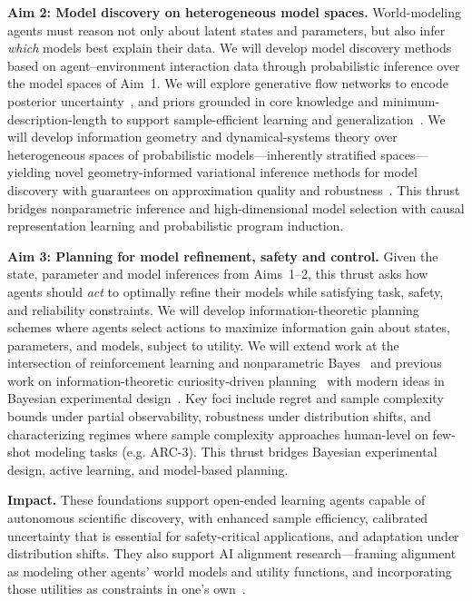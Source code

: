 \documentclass[11pt,letterpaper]{article}
\begin{document}
\textbf{Aim 2: Model discovery on heterogeneous model spaces.}
World-modeling agents must reason not only about latent states and parameters, but also infer \emph{which} models best explain their data. We will develop model discovery methods based on agent--environment interaction data through probabilistic inference over the model spaces of Aim~1. We will explore generative flow networks to encode posterior uncertainty~\cite{bengio_gflownet_2023}, and priors grounded in core knowledge and minimum-description-length to support sample-efficient learning and generalization~\cite{da_costa_overfitting_nodate,pouncyInductiveBiasesTheorybased2022}. We will develop information geometry and dynamical-systems theory over heterogeneous spaces of probabilistic models---inherently stratified spaces---yielding novel geometry-informed variational inference methods for model discovery with guarantees on approximation quality and robustness~\cite{dacostaPossiblePrinciplesAligned2025}. This thrust bridges nonparametric inference and high-dimensional model selection with causal representation learning and probabilistic program induction.


\textbf{Aim 3: Planning for model refinement, safety and control.}
Given the state, parameter and model inferences from Aims~1--2, this thrust asks how agents should \emph{act} to optimally refine their models while satisfying task, safety, and reliability constraints. We will develop information-theoretic planning schemes where agents select actions to maximize information gain about states, parameters, and models, subject to utility. We will extend work at the intersection of reinforcement learning and nonparametric Bayes~\cite{doshi} and previous work on information-theoretic curiosity-driven planning~\cite{friston_sophisticated_2021,champion_branching_2021,paul_efficient_2023} with modern ideas in Bayesian experimental design~\cite{rainforthModernBayesianExperimental2023}. Key foci include regret and sample complexity bounds under partial observability, robustness under distribution shifts, and characterizing regimes where sample complexity approaches human-level on few-shot modeling tasks (e.g. ARC-3). This thrust bridges Bayesian experimental design, active learning, and model-based planning.

\textbf{Impact.} These foundations support open-ended learning agents capable of autonomous scientific discovery, with enhanced sample efficiency, calibrated uncertainty that is essential for safety-critical applications, and adaptation under distribution shifts. They also support AI alignment research---framing alignment as modeling other agents' world models and utility functions, and incorporating those utilities as constraints in one's own~\cite{dacostaPossiblePrinciplesAligned2025}.
\end{document}
